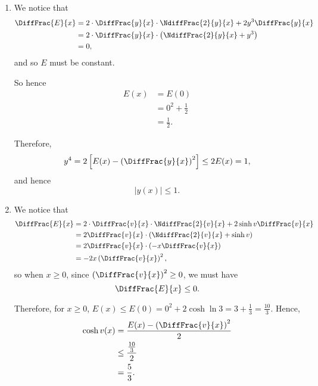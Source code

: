 \Question{\currfilebase}

\begin{enumerate}
    \item We notice that
          \begin{align*}
              \DiffFrac{E}{x} & = 2 \cdot \DiffFrac{y}{x} \cdot \NdiffFrac{2}{y}{x} + 2 y^3 \DiffFrac{y}{x} \\
                              & = 2 \cdot \DiffFrac{y}{x} \cdot \left(\NdiffFrac{2}{y}{x} + y^3\right)      \\
                              & = 0,
          \end{align*}
          and so \(E\) must be constant.

          So hence
          \begin{align*}
              E(x) & = E(0)              \\
                   & = 0^2 + \frac{1}{2} \\
                   & = \frac{1}{2}.
          \end{align*}

          Therefore,
          \[
              y^4 = 2\left[E(x) - \left(\DiffFrac{y}{x}\right)^2\right] \leq 2 E(x) = 1,
          \]
          and hence
          \[
              |y(x)| \leq 1.
          \]

    \item We notice that
          \begin{align*}
              \DiffFrac{E}{x} & = 2 \cdot \DiffFrac{v}{x} \cdot \NdiffFrac{2}{v}{x} + 2 \sinh v \DiffFrac{v}{x} \\
                              & = 2 \DiffFrac{v}{x} \cdot \left(\NdiffFrac{2}{v}{x} + \sinh v\right)            \\
                              & = 2 \DiffFrac{v}{x} \cdot \left(-x \DiffFrac{v}{x}\right)                       \\
                              & = -2x \left(\DiffFrac{v}{x}\right)^2,
          \end{align*}
          so when \(x \geq 0\), since \(\left(\DiffFrac{v}{x}\right)^2 \geq 0\), we must have
          \[
              \DiffFrac{E}{x} \leq 0.
          \]

          Therefore, for \(x \geq 0\), \(E(x) \leq E(0) = 0^2 + 2 \cosh \ln 3 = 3 + \frac{1}{3} = \frac{10}{3}\). Hence,
          \begin{align*}
              \cosh v(x) & = \frac{E(x) - \left(\DiffFrac{v}{x}\right)^2}{2} \\
                         & \leq \frac{\frac{10}{3}}{2}                       \\
                         & = \frac{5}{3}.
          \end{align*}


\end{enumerate}
